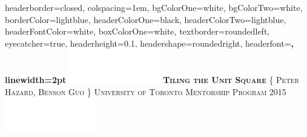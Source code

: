 \documentclass[landscape,a0paper,fontscale=0.285]{baposter} %
\begin{document}
\begin{poster}
{
headerborder=closed, %
colspacing=1em, %
bgColorOne=white, %
bgColorTwo=white, %
borderColor=lightblue, %
headerColorOne=black, %
headerColorTwo=lightblue, %
headerFontColor=white, %
boxColorOne=white, %
textborder=roundedleft, %
eyecatcher=true, %
headerheight=0.1\textheight, %
headershape=roundedright, %
headerfont=\Large\bf\textsc, %
linewidth=2pt %
}
%
{\includegraphics[height=4em]{logo.png}} %
{\bf\textsc{Tiling the Unit Square}\vspace{0.5em}} %
{\textsc{\{ Peter Hazard, Benson Guo \} \hspace{12pt} University of Toronto Mentorship Program 2015}} %
{\includegraphics[height=4em]{logo.png}} %



\end{poster}
\end{document}
